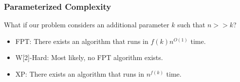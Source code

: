 \begin{frame}[t]
	\frametitle{Parameterized Complexity}
	What if our problem considers an additional parameter $k$ such that $n >> k$?
	\vspace{1.0cm}
	\begin{itemize}
		\item FPT: There exists an algorithm that runs in $f(k)n^{O(1)}$ time.
		\vspace{1.0cm}
		\item W[2]-Hard: Most likely, no FPT algorithm exists.
		\vspace{1.0cm}
		\item XP: There exists an algorithm that runs in $n^{f(k)}$ time.
	\end{itemize}
\end{frame}